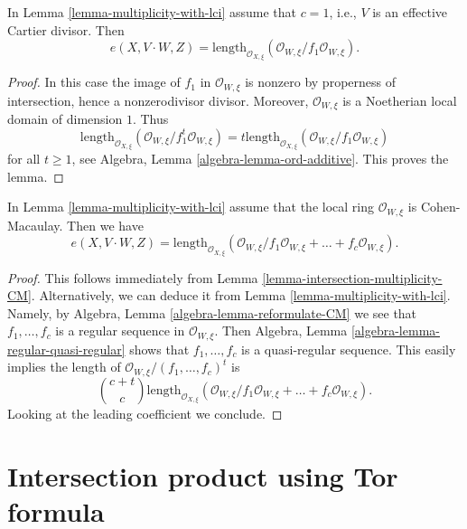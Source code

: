 \begin{lemma}
\label{lemma-multiplicity-with-effective-Cartier-divisor}
In Lemma \ref{lemma-multiplicity-with-lci} assume that  $c = 1$, i.e., $V$
is an effective Cartier divisor. Then
$$
e(X, V \cdot W, Z) =
\text{length}_{\mathcal{O}_{X, \xi}}
(\mathcal{O}_{W, \xi}/f_1\mathcal{O}_{W, \xi}).
$$
\end{lemma}

\begin{proof}
In this case the image of $f_1$ in $\mathcal{O}_{W, \xi}$ is nonzero by
properness of intersection, hence a nonzerodivisor divisor. Moreover,
$\mathcal{O}_{W, \xi}$ is a Noetherian local domain of dimension $1$.
Thus
$$
\text{length}_{\mathcal{O}_{X, \xi}}
(\mathcal{O}_{W, \xi}/f_1^t\mathcal{O}_{W, \xi}) =
t \text{length}_{\mathcal{O}_{X, \xi}}
(\mathcal{O}_{W, \xi}/f_1\mathcal{O}_{W, \xi})
$$
for all $t \geq 1$, see Algebra, Lemma \ref{algebra-lemma-ord-additive}.
This proves the lemma.
\end{proof}

\begin{lemma}
\label{lemma-multiplicity-lci-CM}
In Lemma \ref{lemma-multiplicity-with-lci} assume that
the local ring $\mathcal{O}_{W, \xi}$ is Cohen-Macaulay. Then we
have
$$
e(X, V \cdot W, Z) =
\text{length}_{\mathcal{O}_{X, \xi}} (\mathcal{O}_{W, \xi}/
f_1\mathcal{O}_{W, \xi} + \ldots + f_c\mathcal{O}_{W, \xi}).
$$
\end{lemma}

\begin{proof}
This follows immediately from Lemma \ref{lemma-intersection-multiplicity-CM}.
Alternatively, we can deduce it from Lemma \ref{lemma-multiplicity-with-lci}.
Namely, by Algebra, Lemma \ref{algebra-lemma-reformulate-CM}
we see that $f_1, \ldots, f_c$ is a regular sequence in
$\mathcal{O}_{W, \xi}$. Then
Algebra, Lemma \ref{algebra-lemma-regular-quasi-regular} shows that
$f_1, \ldots, f_c$ is a quasi-regular sequence.
This easily implies the length of
$\mathcal{O}_{W, \xi}/(f_1, \ldots, f_c)^t$ is
$$
{c + t \choose c}
\text{length}_{\mathcal{O}_{X, \xi}} (\mathcal{O}_{W, \xi}/
f_1\mathcal{O}_{W, \xi} + \ldots + f_c\mathcal{O}_{W, \xi}).
$$
Looking at the leading coefficient we conclude.
\end{proof}


\section{Intersection product using Tor formula}
\label{section-intersection-product}


